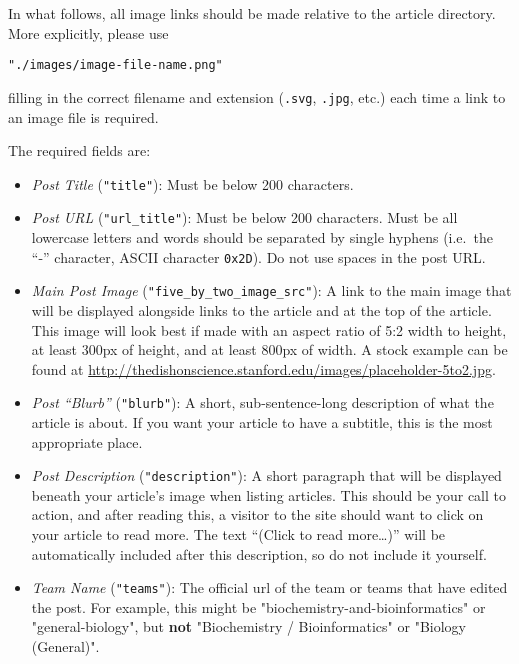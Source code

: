 \documentclass[paper=a4, fontsize=11pt]{scrartcl}
\numberwithin{equation}{section}        %
\numberwithin{figure}{section}            %
\numberwithin{table}{section}                %
\newcommand{\dishurlplain}[1]{http://thedishonscience.stanford.edu/#1}
\newcommand{\dishurl}[1]{\url{\dishurlplain{#1}}}
\begin{document}
In what follows, all image links should be made relative to the article
directory. More explicitly, please use
\begin{verbatim}"./images/image-file-name.png"\end{verbatim}
filling in the correct filename and extension (\texttt{.svg}, \texttt{.jpg},
etc.) each time a link to an image file is required.

\noindent{}The required fields are:\@
\begin{itemize}
    \item \emph{Post Title} (\texttt{"title"}): Must be below 200 characters.
    \item \emph{Post URL} (\texttt{"url\_title"}): Must be below 200 characters.
        Must be all lowercase letters and words should be separated by single
        hyphens (i.e.\ the ``-'' character, ASCII character \texttt{0x2D}). Do
        not use spaces in the post URL.
    \item \emph{Main Post Image} (\texttt{"five\_by\_two\_image\_src"}): A link to the main image that will be
        displayed alongside links to the article and at the top of the article.
        This image will look best if made with an aspect ratio of 5:2 width to
        height, at least 300px of height, and at least 800px of width. A stock
        example can be found at \dishurl{images/placeholder-5to2.jpg}.
    \item \emph{Post ``Blurb''} (\texttt{"blurb"}): A short, sub-sentence-long description of what
        the article is about. If you want your article to have a subtitle, this
        is the most appropriate place.
    \item \emph{Post Description} (\texttt{"description"}): A short paragraph that will be displayed
        beneath your article's image when listing articles. This should be your
        call to action, and after reading this, a visitor to the site should
        want to click on your article to read more. The text ``(Click to read
        more\ldots{})'' will be automatically included after this description, so do
        not include it yourself.
    \item \emph{Team Name} (\texttt{"teams"}): The official url of the team or teams that have edited the
        post. For example, this might be "biochemistry-and-bioinformatics" or
        "general-biology", but \textbf{not} "Biochemistry / Bioinformatics" or
        "Biology (General)".
\end{itemize}
\end{document}

